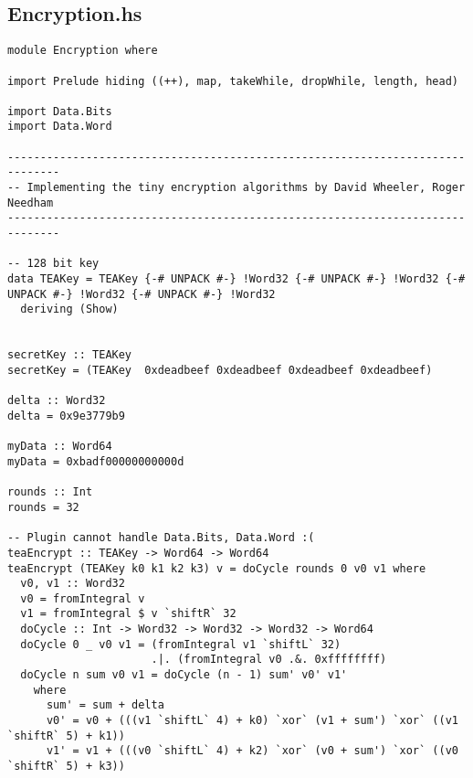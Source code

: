
\subsection{Encryption.hs}
\label{A:encryp}

\begin{verbatim}
module Encryption where

import Prelude hiding ((++), map, takeWhile, dropWhile, length, head)

import Data.Bits
import Data.Word

------------------------------------------------------------------------------
-- Implementing the tiny encryption algorithms by David Wheeler, Roger Needham
------------------------------------------------------------------------------

-- 128 bit key
data TEAKey = TEAKey {-# UNPACK #-} !Word32 {-# UNPACK #-} !Word32 {-# UNPACK #-} !Word32 {-# UNPACK #-} !Word32
  deriving (Show)


secretKey :: TEAKey
secretKey = (TEAKey  0xdeadbeef 0xdeadbeef 0xdeadbeef 0xdeadbeef)

delta :: Word32
delta = 0x9e3779b9

myData :: Word64
myData = 0xbadf00000000000d

rounds :: Int
rounds = 32

-- Plugin cannot handle Data.Bits, Data.Word :(
teaEncrypt :: TEAKey -> Word64 -> Word64
teaEncrypt (TEAKey k0 k1 k2 k3) v = doCycle rounds 0 v0 v1 where
  v0, v1 :: Word32
  v0 = fromIntegral v
  v1 = fromIntegral $ v `shiftR` 32
  doCycle :: Int -> Word32 -> Word32 -> Word32 -> Word64
  doCycle 0 _ v0 v1 = (fromIntegral v1 `shiftL` 32)
                      .|. (fromIntegral v0 .&. 0xffffffff)
  doCycle n sum v0 v1 = doCycle (n - 1) sum' v0' v1'
    where
      sum' = sum + delta
      v0' = v0 + (((v1 `shiftL` 4) + k0) `xor` (v1 + sum') `xor` ((v1 `shiftR` 5) + k1))
      v1' = v1 + (((v0 `shiftL` 4) + k2) `xor` (v0 + sum') `xor` ((v0 `shiftR` 5) + k3))
\end{verbatim}






